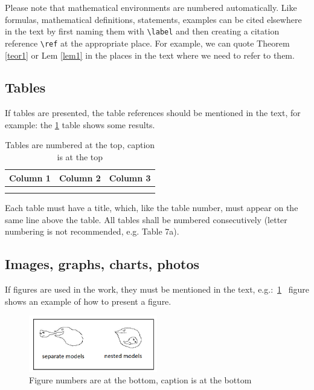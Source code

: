 \documentclass[]{VUMIFTemplateClass}
\begin{document}
    \bigskip

    Please note that mathematical environments are numbered automatically. Like formulas, mathematical definitions, statements, examples can be cited elsewhere in the text by first naming them with \texttt{\textbackslash label} and then creating a citation reference \texttt{\textbackslash ref} at the appropriate place. For example, we can quote Theorem \ref{teor1} or Lem \ref{lem1} in the places in the text where we need to refer to them.

\subsection{Tables}

If tables are presented, the table references should be mentioned in the text, for example: the \ref{tab:xydata} table shows some results.

\begin{table}[H]
    \centering
    \caption{Tables are numbered at the top, caption is at the top}
    \begin{tabular}{|c|c|c|}
        \hline
        Column 1 & Column 2 & Column 3 \\
        \hline
         & &  \\
         \hline
         & & \\
         \hline
    \end{tabular}
    \label{tab:xydata}
\end{table}


Each table must have a title, which, like the table number, must appear on the same line above the table. All tables shall be numbered consecutively (letter numbering is not recommended, e.g. Table 7a).

\subsection{Images, graphs, charts, photos}
If figures are used in the work, they must be mentioned in the text, e.g.:~\ref{fig:graph1}~ figure shows an example of how to present a figure.

\begin{figure}[H]
    \centering
    \includegraphics[width=0.5\textwidth]{images/AIC.png}
    \caption{Figure numbers are at the bottom, caption is at the bottom}
    \label{fig:graph1}
\end{figure}
\end{document}
